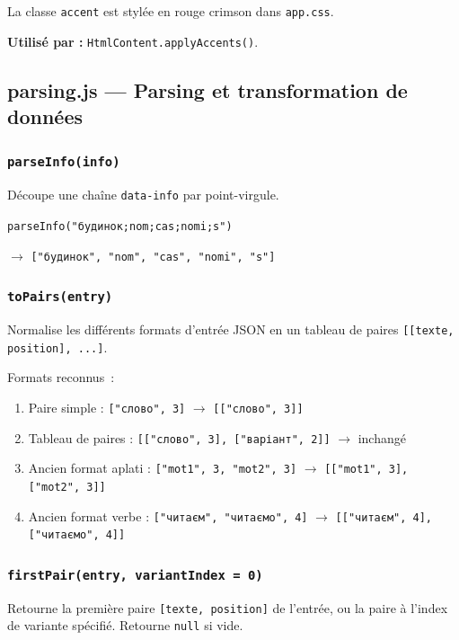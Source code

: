 La classe \texttt{accent} est stylée en rouge crimson dans \texttt{app.css}.

\textbf{Utilisé par :} \texttt{HtmlContent.applyAccents()}.

\subsection{parsing.js --- Parsing et transformation de données}

\subsubsection{\texttt{parseInfo(info)}}

Découpe une chaîne \texttt{data-info} par point-virgule.

\begin{ukrbox}
\texttt{parseInfo("будинок;nom;cas;nomi;s")}

$\rightarrow$ \texttt{["будинок", "nom", "cas", "nomi", "s"]}
\end{ukrbox}

\subsubsection{\texttt{toPairs(entry)}}

Normalise les différents formats d'entrée JSON en un tableau de paires \texttt{[[texte, position], ...]}.

Formats reconnus~:
\begin{enumerate}
  \item Paire simple : \texttt{["слово", 3]} $\rightarrow$ \texttt{[["слово", 3]]}
  \item Tableau de paires : \texttt{[["слово", 3], ["варіант", 2]]} $\rightarrow$ inchangé
  \item Ancien format aplati : \texttt{["mot1", 3, "mot2", 3]} $\rightarrow$ \texttt{[["mot1", 3], ["mot2", 3]]}
  \item Ancien format verbe : \texttt{["читаєм", "читаємо", 4]} $\rightarrow$ \texttt{[["читаєм", 4], ["читаємо", 4]]}
\end{enumerate}

\subsubsection{\texttt{firstPair(entry, variantIndex = 0)}}

Retourne la première paire \texttt{[texte, position]} de l'entrée, ou la paire à l'index de variante spécifié. Retourne \texttt{null} si vide.

